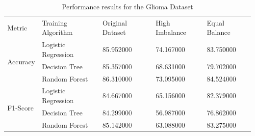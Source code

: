 \begin{table}[p]
\caption{Performance results for the Glioma Dataset}
\begin{tabular}{lllll}
Metric & Training Algorithm & Original Dataset & High Imbalance & Equal Balance \\
\multirow[c]{3}{*}{Accuracy} & Logistic Regression & 85.952000 & 74.167000 & 83.750000 \\
 & Decision Tree & 85.357000 & 68.631000 & 79.702000 \\
 & Random Forest & 86.310000 & 73.095000 & 84.524000 \\
\multirow[c]{3}{*}{F1-Score} & Logistic Regression & 84.667000 & 65.156000 & 82.379000 \\
 & Decision Tree & 84.299000 & 56.987000 & 76.862000 \\
 & Random Forest & 85.142000 & 63.088000 & 83.275000 \\
\end{tabular}
\end{table}
